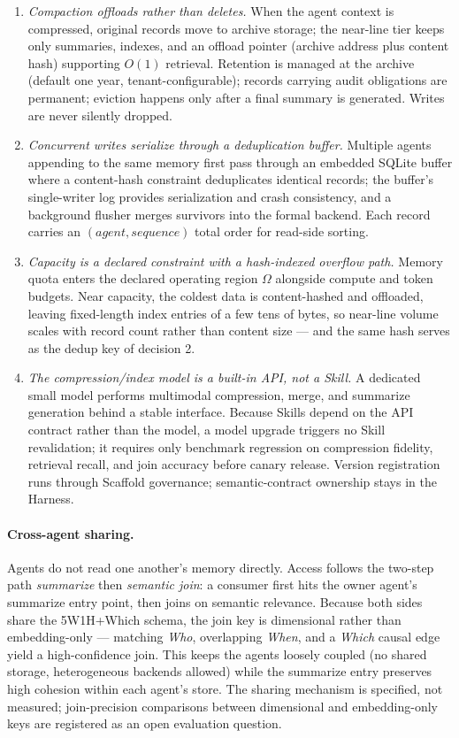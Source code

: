 \begin{enumerate}
\item \textit{Compaction offloads rather than deletes.} When the agent context is compressed, original records move to archive storage; the near-line tier keeps only summaries, indexes, and an offload pointer (archive address plus content hash) supporting $O(1)$ retrieval. Retention is managed at the archive (default one year, tenant-configurable); records carrying audit obligations are permanent; eviction happens only after a final summary is generated. Writes are never silently dropped.
\item \textit{Concurrent writes serialize through a deduplication buffer.} Multiple agents appending to the same memory first pass through an embedded SQLite buffer where a content-hash constraint deduplicates identical records; the buffer's single-writer log provides serialization and crash consistency, and a background flusher merges survivors into the formal backend. Each record carries an $(agent, sequence)$ total order for read-side sorting.
\item \textit{Capacity is a declared constraint with a hash-indexed overflow path.} Memory quota enters the declared operating region $\Omega$ alongside compute and token budgets. Near capacity, the coldest data is content-hashed and offloaded, leaving fixed-length index entries of a few tens of bytes, so near-line volume scales with record count rather than content size --- and the same hash serves as the dedup key of decision 2.
\item \textit{The compression/index model is a built-in API, not a Skill.} A dedicated small model performs multimodal compression, merge, and summarize generation behind a stable interface. Because Skills depend on the API contract rather than the model, a model upgrade triggers no Skill revalidation; it requires only benchmark regression on compression fidelity, retrieval recall, and join accuracy before canary release. Version registration runs through Scaffold governance; semantic-contract ownership stays in the Harness.
\end{enumerate}

\paragraph{Cross-agent sharing.}
Agents do not read one another's memory directly. Access follows the two-step path \textit{summarize} then \textit{semantic join}: a consumer first hits the owner agent's summarize entry point, then joins on semantic relevance. Because both sides share the 5W1H+Which schema, the join key is dimensional rather than embedding-only --- matching \textit{Who}, overlapping \textit{When}, and a \textit{Which} causal edge yield a high-confidence join. This keeps the agents loosely coupled (no shared storage, heterogeneous backends allowed) while the summarize entry preserves high cohesion within each agent's store. The sharing mechanism is specified, not measured; join-precision comparisons between dimensional and embedding-only keys are registered as an open evaluation question.

